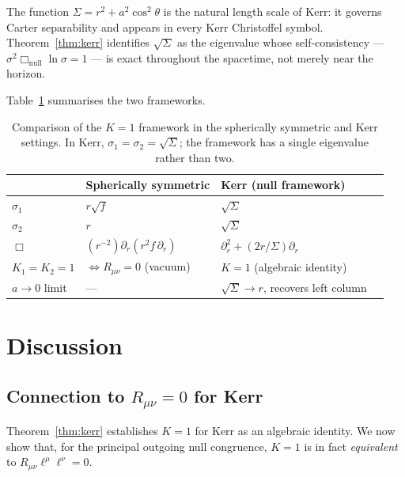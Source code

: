 \documentclass{iopart}
\begin{document}
\begin{remark}
The function $\Sigma=r^2+a^2\cos^2\!\theta$ is the natural
length scale of Kerr: it governs Carter separability and appears in
every Kerr Christoffel symbol.
Theorem~\ref{thm:kerr} identifies $\sqrt{\Sigma}$ as the
eigenvalue whose self-consistency — $\sigma^2\Box_\mathrm{null}
\ln\sigma=1$ — is exact throughout the spacetime, not merely
near the horizon.
\end{remark}

Table~\ref{tab:comparison} summarises the two frameworks.

\begin{table}[h]
\centering
\renewcommand{\arraystretch}{1.3}
\begin{tabular}{@{}llll@{}}
\toprule
 & Spherically symmetric & Kerr (null framework) \\
\midrule
$\sigma_1$ & $r\sqrt{f}$ & $\sqrt{\Sigma}$ \\
$\sigma_2$ & $r$         & $\sqrt{\Sigma}$ \\
$\Box$ & $(r^{-2})\partial_r(r^2 f\,\partial_r)$
       & $\partial_r^2+(2r/\Sigma)\partial_r$ \\
$K_1=K_2=1$ & $\Leftrightarrow R_{\mu\nu}=0$ (vacuum) &
  $K{=}1$ (algebraic identity) \\
$a\to 0$ limit & --- & $\sqrt{\Sigma}\to r$, recovers left column \\
\bottomrule
\end{tabular}
\caption{Comparison of the $K{=}1$ framework in the spherically
symmetric and Kerr settings.
In Kerr, $\sigma_1=\sigma_2=\sqrt{\Sigma}$; the framework has a
single eigenvalue rather than two.}
\label{tab:comparison}
\end{table}

\section{Discussion}\label{sec:discussion}

\subsection*{Connection to $R_{\mu\nu}=0$ for Kerr}

Theorem~\ref{thm:kerr} establishes $K{=}1$ for Kerr as an
algebraic identity.
We now show that, for the principal outgoing null congruence,
$K{=}1$ is in fact \emph{equivalent} to
$R_{\mu\nu}\ell^\mu\ell^\nu=0$.
\end{document}
